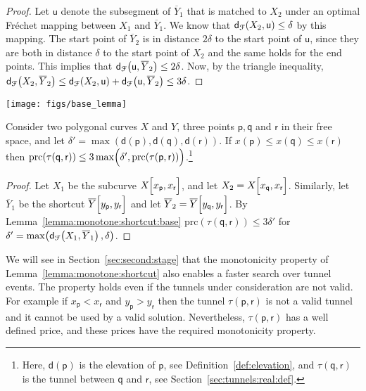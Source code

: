 \documentclass[12pt]{article}
\newcommand{\secref}[1]{Section~\ref{sec:#1}}
\newcommand{\lemlab}[1]{\label{lemma:#1}}
\newcommand{\lemref}[1]{Lemma~\ref{lemma:#1}}
\newcommand{\defref}[1]{Definition~\ref{def:#1}}
\newcommand{\ts}{\hspace{0.6pt}}
\newcommand{\Frechet}{Fr\'{e}c{h}e{}t\xspace}\providecommand{\Arr}{\mathop{\mathrm{\EuScript{A}}}}
\newcommand{\distFr}[2]{\mathsf{d}_{\EuScript{F}}\pth{#1, #2}}
\newcommand{\pnt}{\mathsf{p}}
\newcommand{\pntA}{\mathsf{q}}
\newcommand{\pntB}{\mathsf{r}}
\newcommand{\x}{x}
\newcommand{\y}{y}
\newcommand{\ACoord}[1]{\x_{#1}}
\newcommand{\BCoord}[1]{\y_{#1}}
\newcommand{\xPnt}{\ACoord{\pnt}}
\newcommand{\yPnt}{\BCoord{\pnt}}
\newcommand{\xPntA}{\ACoord{\pntA}}
\newcommand{\yPntA}{\BCoord{\pntA}}
\newcommand{\xPntB}{\ACoord{\pntB}}
\newcommand{\yPntB}{\BCoord{\pntB}}
\newcommand{\SimplifyX}[1]{#1}
\newcommand{\SubCurvifyY}[1]{{#1}}
\newcommand{\cXBase}{X} \newcommand{\cYBase}{Y} \newcommand{\crvCBase}{{\pi}}
\newcommand{\cX}{\SimplifyX{\cXBase}}
\newcommand{\subcX}[1]{\SubCurvifyY{\cX}_{#1}}
\newcommand{\cY}{\SimplifyX{\cYBase}}
\newcommand{\subsegY}[1]{\overline{\cY}_{#1}}
\newcommand{\segA}{\mathsf{u}}
\providecommand{\pth}[2][\!]{#1\left({#2}\right)}
\providecommand{\MakeSBig}{\rule[0.0cm]{0.0cm}{0.35cm}}
\newcommand{\pbrcZ}[1]{\left[ \MakeSBig {#1} \right]}
\newcommand{\SubCrv}[3]{{#1}\!\!\ts\ts\pbrcZ{#2, #3}}
\newcommand{\ScutCrv}[3]{\overline{#1}\!\pbrcZ{#2, #3}}
\newcommand{\frVal}[1]{\mathsf{d}\pth{#1}}
\newcommand{\constSC}{3}
\newcommand{\tunnel}{tunnel\xspace}
\newcommand{\tunnelLtr}{\mathsf{\tau}}
\newcommand{\xtunnel}[2]{\tunnelLtr\pth{ #1,  #2}}
\newcommand{\priceX}[1]{\mathrm{p{r}c}\pth{#1}}
\numberwithin{figure}{section}
\numberwithin{equation}{section}
\begin{document}
\noindent
\begin{minipage}{0.8\textwidth}
    \begin{proof}
        Let $\segA$ denote the subsegment of $\subsegY{1}$ that is
        matched to $\subcX{2}$ under an optimal \Frechet mapping
        between $\subcX{1}$ and $\subsegY{1}$.  We know that
        $\distFr{\subcX{2}}{\segA} \leq \delta$ by this mapping.  The
        start point of $\subsegY{2}$ is in distance $2\delta$ to the
        start point of $\segA$, since they are both in distance
        $\delta$ to the start point of $\subcX{2}$ and the same holds
        for the end points. This implies that
        $\distFr{\segA}{\subsegY{2}}\leq 2\delta$.  Now, by the
        triangle inequality, $\distFr{\subcX{2}}{\subsegY{2}} \leq
        \distFr{\subcX{2}}{\segA} + \distFr{\segA}{\subsegY{2}} \leq
        \constSC \delta$.
    \end{proof}
\end{minipage}\begin{minipage}{0.19\textwidth}
    \hfill {\texttt{[image: figs/base\_lemma]}}
\end{minipage}

\begin{lemma}\lemlab{monotone:shortcut}Consider two polygonal curves $\cX$ and $\cY$, three points $\pnt,
    \pntA$ and $\pntB$ in their free space, and let $\delta' =
    \max(\frVal{\pnt}, \frVal{\pntA}, \frVal{\pntB})$. If $x(\pnt)
    \leq \x(\pntA) \leq \x(\pntB)$ then
    $\priceX{\xtunnel{\pntA}{\pntB}} \leq 3 \max \pth{\MakeSBig
       \delta', \priceX{\xtunnel{\pnt}{\pntB} } }$.\footnote{Here, $\frVal{\pnt}$ is the elevation of $\pnt$, see
       \defref{elevation}, and $\xtunnel{\pntA}{\pntB}$ is the tunnel
       between $\pntA$ and $\pntB$, see \secref{tunnels:real:def}.}
\end{lemma}

\begin{proof}
    Let $\subcX{1}$ be the subcurve $\SubCrv{\cX}{\xPnt}{\xPntB}$, and
    let $\subcX{2} = \SubCrv{\cX}{\xPntA}{\xPntB}$.  Similarly, let
    $\subsegY{1}$ be the shortcut $\ScutCrv{\cY}{\yPnt}{\yPntB}$ and
    let $\subsegY{2} = \ScutCrv{\cY}{\yPntA}{\yPntB}$. By
    \lemref{monotone:shortcut:base} $\priceX{\xtunnel{\pntA}{\pntB}}
    \leq 3\delta'$ for $\delta' = \max \pth{
       \distFr{\subcX{1}}{\subsegY{1}}, \delta}$.
\end{proof}


We will see in \secref{second:stage} that the monotonicity property of
\lemref{monotone:shortcut} also enables a faster search over tunnel
events. The property holds even if the \tunnel{}s under consideration
are not valid. For example if $\xPnt < \xPntB$ and $\yPnt > \yPntB$
then the tunnel $\xtunnel{\pnt}{\pntB}$ is not a valid tunnel and it
cannot be used by a valid solution. Nevertheless,
$\xtunnel{\pnt}{\pntB}$ has a well defined price, and these prices
have the required monotonicity property.
\end{document}
